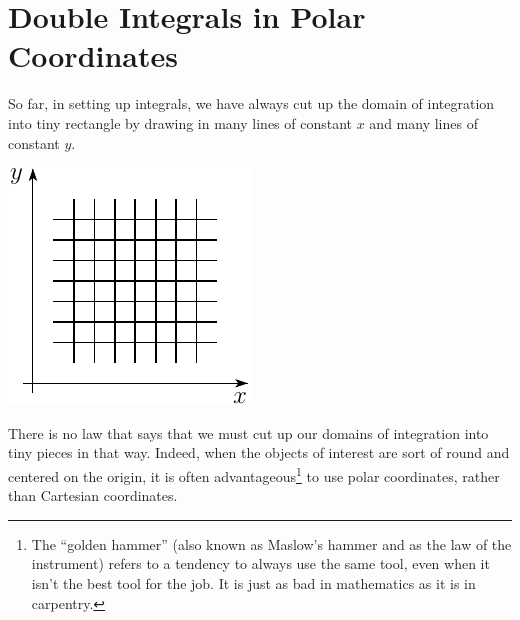 \section{Double Integrals in Polar Coordinates} \label{sec polars}
So far, in setting up integrals, we have always cut up the
domain of integration into tiny rectangle by drawing in many lines
of constant $x$ and many lines of constant $y$.
\begin{efig}
\begin{center}
   \includegraphics{intDecomp3.pdf}
\end{center}
\end{efig}
There is no law that says that we must cut up our domains of integration
into tiny pieces in that way. Indeed, when the objects of interest
are sort of round and centered on the origin, it is often 
advantageous\footnote{The ``golden hammer'' (also known as Maslow's hammer
and as the law of the instrument) refers to a tendency to always use 
the same tool, even when it isn't the best tool for the job.
It is just as bad in mathematics as it is in carpentry.} 
to use polar coordinates, rather than Cartesian coordinates. 


